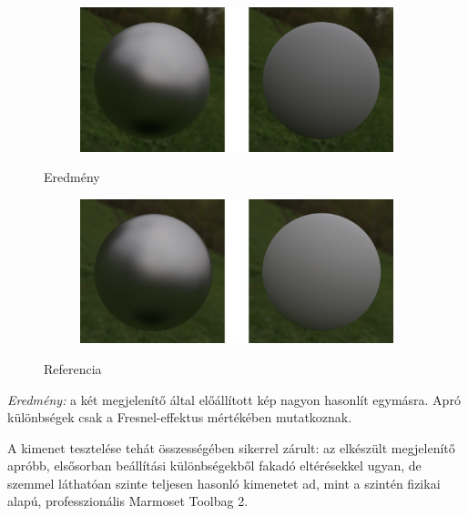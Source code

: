\begin{figure}[!ht]
    \centering
    \begin{subfigure}[b]{\textwidth}
        \centering
        \includegraphics[width=\textwidth]{images/scr_metalness.png}
    \end{subfigure}
    \caption{Eredmény}
\end{figure}

\begin{figure}[!ht]
    \centering
    \begin{subfigure}[b]{\textwidth}
        \centering
        \includegraphics[width=\textwidth]{images/marmoset_metalness.png}
    \end{subfigure}
    \caption{Referencia}
\end{figure}

\textit{Eredmény:} a két megjelenítő által előállított kép nagyon hasonlít egymásra. Apró különbségek csak a Fresnel-effektus mértékében mutatkoznak.

A kimenet tesztelése tehát összességében sikerrel zárult: az elkészült megjelenítő apróbb, elsősorban beállítási különbségekből fakadó eltérésekkel ugyan, de szemmel láthatóan szinte teljesen hasonló kimenetet ad, mint a szintén fizikai alapú, professzionális Marmoset Toolbag 2.

{}
 